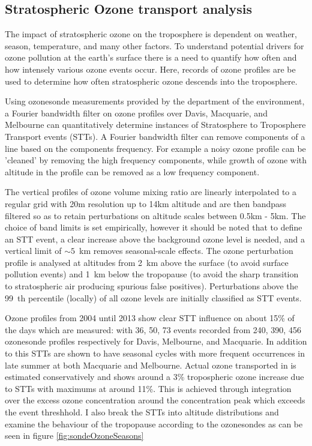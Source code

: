 \subsection{Stratospheric Ozone transport analysis}
The impact of stratospheric ozone on the troposphere is dependent on weather, season, temperature, and many other factors.
To understand potential drivers for ozone pollution at the earth's surface there is a need to quantify how often and how intensely various ozone events occur.
Here, records of ozone profiles are be used to determine how often stratospheric ozone descends into the troposphere.

Using ozonesonde measurements provided by the department of the environment, a Fourier bandwidth filter on ozone profiles over Davis, Macquarie, and Melbourne can quantitatively determine instances of Stratosphere to Troposphere Transport events (STTs).
A Fourier bandwidth filter can remove components of a line based on the components frequency.
For example a noisy ozone profile can be 'cleaned' by removing the high frequency components, while growth of ozone with altitude in the profile can be removed as a low frequency component. 

The vertical profiles of ozone volume mixing ratio are linearly interpolated to a regular grid with 20m resolution up to 14km altitude and are then bandpass filtered so as to retain perturbations on altitude scales between 0.5km - 5km. 
The choice of band limits is set empirically, however it should be noted that to define an STT event, a clear increase above the background ozone level is needed, and a vertical limit of $\sim 5$~km removes seasonal-scale effects. 
The ozone perturbation profile is analysed at altitudes from 2~km above the surface (to avoid surface pollution events) and 1~km below the tropopause (to avoid the sharp transition to stratospheric air producing spurious false positives).
Perturbations above the 99~th percentile (locally) of all ozone levels are initially classified as STT events.

Ozone profiles from 2004 until 2013 show clear STT influence on about 15\% of the days which are measured: with 36, 50, 73 events recorded from 240, 390, 456 ozonesonde profiles respectively for Davis, Melbourne, and Macquarie.
In addition to this STTs are shown to have seasonal cycles with more frequent occurrences in late summer at both Macquarie and Melbourne.
Actual ozone transported in is estimated conservatively and shows around a 3\% tropospheric ozone increase due to STTs with maximums at around 11\%.
This is achieved through integration over the excess ozone concentration around the concentration peak which exceeds the event threshhold. 
I also break the STTs into altitude distributions and examine the behaviour of the tropopause according to the ozonesondes as can be seen in figure \ref{fig:sondeOzoneSeasons}

